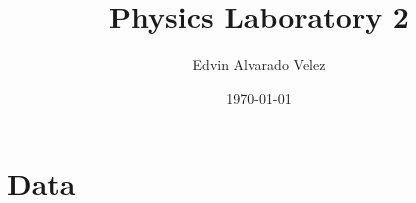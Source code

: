 \documentclass[a4paper,12pt]{article}
\title{Physics Laboratory 2}
\author{Edvin Alvarado Velez}
\date{\today}
\begin{document}
\maketitle
\tableofcontents

\section{Data}
\end{document}
